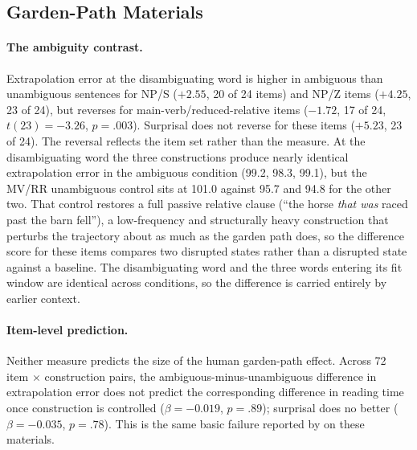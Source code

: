 \documentclass[12pt]{article}
\newcommand{\new}[1]{#1}   %
\begin{document}
\new{\subsection{Garden-Path Materials}

\paragraph{The ambiguity contrast.} Extrapolation error at the disambiguating word is higher in ambiguous than unambiguous sentences for NP/S ($+2.55$, 20 of 24 items) and NP/Z items ($+4.25$, 23 of 24), but reverses for main-verb/reduced-relative items ($-1.72$, 17 of 24, $t(23) = -3.26$, $p = .003$). Surprisal does not reverse for these items ($+5.23$, 23 of 24). The reversal reflects the item set rather than the measure. At the disambiguating word the three constructions produce nearly identical extrapolation error in the ambiguous condition (99.2, 98.3, 99.1), but the MV/RR unambiguous control sits at 101.0 against 95.7 and 94.8 for the other two. That control restores a full passive relative clause (``the horse \emph{that was} raced past the barn fell''), a low-frequency and structurally heavy construction that perturbs the trajectory about as much as the garden path does, so the difference score for these items compares two disrupted states rather than a disrupted state against a baseline. The disambiguating word and the three words entering its fit window are identical across conditions, so the difference is carried entirely by earlier context.

\paragraph{Item-level prediction.} Neither measure predicts the size of the human garden-path effect. Across 72 item $\times$ construction pairs, the ambiguous-minus-unambiguous difference in extrapolation error does not predict the corresponding difference in reading time once construction is controlled ($\beta = -0.019$, $p = .89$); surprisal does no better ($\beta = -0.035$, $p = .78$). This is the same basic failure reported by \citet{huang2024} on these materials.

}
\end{document}
